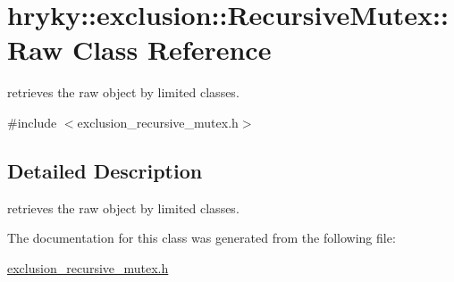 \hypertarget{classhryky_1_1exclusion_1_1_recursive_mutex_1_1_raw}{\section{hryky\-:\-:exclusion\-:\-:Recursive\-Mutex\-:\-:Raw Class Reference}
\label{classhryky_1_1exclusion_1_1_recursive_mutex_1_1_raw}
}


retrieves the raw object by limited classes.  




{\ttfamily \#include $<$exclusion\-\_\-recursive\-\_\-mutex.\-h$>$}



\subsection{Detailed Description}
retrieves the raw object by limited classes. 

The documentation for this class was generated from the following file\-:\begin{DoxyCompactItemize}
\item 
\hyperlink{exclusion__recursive__mutex_8h}{exclusion\-\_\-recursive\-\_\-mutex.\-h}\end{DoxyCompactItemize}
